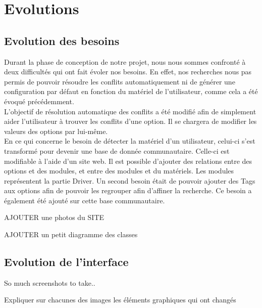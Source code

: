 \documentclass[16pts]{report}
\begin{document}

\nocite{*}

\chapter{Evolutions}
\label{cha:Evolutions}

\section{Evolution des besoins}
\label{sec:Evolution des besoins}

Durant la phase de conception de notre projet, nous nous sommes confronté à 
deux difficultés qui ont fait évoler nos besoins. En effet, nos recherches 
nous pas permis de pouvoir résoudre les conflits automatiquement ni de générer 
une configuration par défaut en fonction du matériel de l'utilisateur, comme
cela a été évoqué précédemment. 
\\
L'objectif de résolution automatique des conflits a été modifié afin de 
simplement aider l'utilisateur à trouver les conflits d'une option. Il se 
chargera de modifier les valeurs des options par lui-même.
\\
En ce qui concerne le besoin de détecter la matériel d'un utilisateur, celui-ci 
s'est transformé pour devenir une base de donnée communautaire. Celle-ci est 
modifiable à l'aide d'un site web. Il est possible d'ajouter des relations 
entre des options et des modules, et entre des modules et du matériels. Les 
modules représentent la partie Driver. Un second besoin était de pouvoir 
ajouter des Tags aux options afin de pouvoir les regrouper afin d'affiner la 
recherche. Ce besoin a également été ajouté sur cette base communautaire.

AJOUTER une photos du SITE

AJOUTER un petit diagramme des classes

\section{Evolution de l'interface}
\label{sec:Evolution de l'interface}

So much screenshots to take..

Expliquer sur chacunes des images les éléments graphiques qui ont changés
\end{document}
